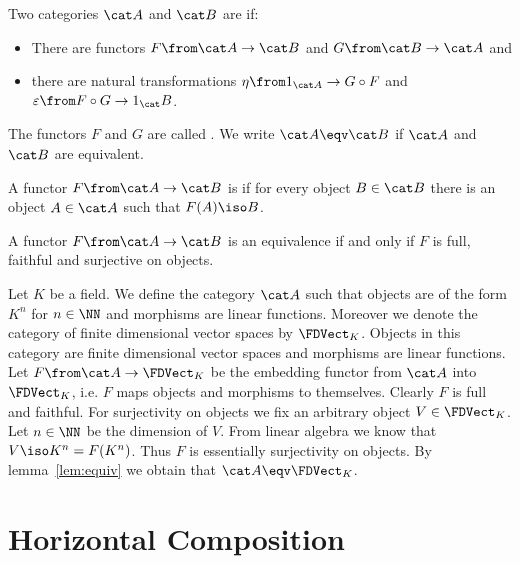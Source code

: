 \begin{defn}
  \label{def:eqv}
  Two categories $\catA$ and $\catB$ are  if:
  \begin{itemize}
    \item There are functors $F \from \catA \to \catB$ and $G \from \catB \to \catA$ and
    \item there are natural transformations $\eta \from 1_{\catA} \to G \circ F$ and $\varepsilon \from F \circ G \to 1_\catB$.
  \end{itemize}
  The functors $F$ and $G$ are called .
  We write $\catA \eqv \catB$ if $\catA$ and $\catB$ are equivalent.
\end{defn}

\begin{defn}
  \label{def:surj-on-obj}
  A functor $F \from \catA \to \catB$ is 
  if for every object $B \in \catB$ there is an object $A \in \catA$ such that $F(A) \iso B$.
\end{defn}

\begin{lemma}
  \label{lem:equiv}
  A functor $F \from \catA \to \catB$ is an equivalence if and only if $F$ is full, faithful and surjective on objects.
\end{lemma}

\begin{exmp}
  Let $K$ be a field.
  We define the category $\catA$ such that objects are of the form $K^n$ for $n \in \NN$ and morphisms are linear functions.
  Moreover we denote the category of finite dimensional vector spaces by $\FDVect_K$.
  Objects in this category are finite dimensional vector spaces and morphisms are linear functions.
  Let $F \from \catA \to \FDVect_K$ be the embedding functor from $\catA$ into $\FDVect_K$, i.e. $F$ maps objects and morphisms to themselves.
  Clearly $F$ is full and faithful.
  For surjectivity on objects we fix an arbitrary object $V \in \FDVect_K$.
  Let $n \in \NN$ be the dimension of $V$.
  From linear algebra we know that $V \iso K^n = F(K^n)$.
  Thus $F$ is essentially surjectivity on objects.
  By lemma~\ref{lem:equiv} we obtain that $\catA \eqv \FDVect_K$.
\end{exmp}


\section{Horizontal Composition}


